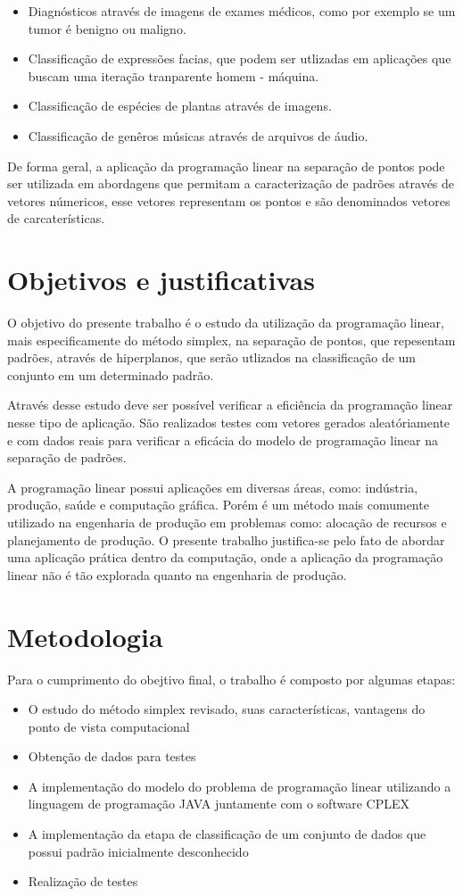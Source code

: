 \begin{itemize}
\item Diagnósticos através de imagens de exames médicos, como por exemplo se um tumor é benigno ou maligno.
\item Classificação de expressões facias, que podem ser utlizadas em aplicações que buscam uma iteração tranparente homem - máquina.
\item Classificação de espécies de plantas através de imagens.
\item Classificação de genêros músicas através de arquivos de áudio.
\end{itemize}

De forma geral, a aplicação da programação linear na separação de pontos pode ser utilizada em abordagens que permitam a caracterização de padrões através de vetores númericos, esse vetores representam os pontos e são denominados vetores de carcaterísticas.

\section{Objetivos e justificativas}
O objetivo do presente trabalho é o estudo da utilização da programação linear, mais especificamente do método simplex, na separação de pontos, que repesentam padrões, através de hiperplanos, que serão utlizados na classificação de um conjunto em um determinado padrão. 

Através desse estudo deve ser possível verificar a eficiência da programação linear nesse tipo de aplicação. São realizados testes com vetores gerados aleatóriamente e com dados reais para verificar a eficácia do modelo de programação linear na separação de padrões.

A programação linear possui aplicações em diversas áreas, como: indústria, produção, saúde e computação gráfica. Porém é um método mais comumente utilizado na engenharia de produção em problemas como: alocação de recursos e planejamento de produção. O presente trabalho justifica-se pelo fato de abordar uma aplicação prática dentro da computação, onde a aplicação da programação linear não é tão explorada quanto na engenharia de produção.

\section{Metodologia}
Para o cumprimento do obejtivo final, o trabalho é composto por algumas etapas:

\begin{itemize} 
\item O estudo do método simplex revisado, suas características, vantagens do ponto de vista computacional
\item Obtenção de dados para testes
\item A implementação do modelo do problema de programação linear utilizando a linguagem de programação JAVA juntamente com o software CPLEX
\item A implementação da etapa de classificação de um conjunto de dados que possui padrão inicialmente desconhecido
\item Realização de testes 
\end{itemize}

